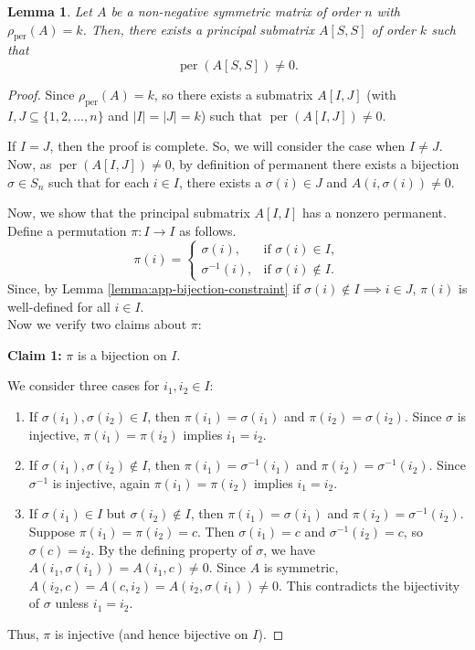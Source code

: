 \documentclass[11pt]{article}
\DeclareMathOperator{\per}{per}
\theoremstyle{plain}
\newtheorem{lemma}[theorem]{Lemma}
\theoremstyle{definition}
\theoremstyle{remark}
\begin{document}
\begin{lemma}\label{lemma:app-principal-existence}
Let \( A \) be a non-negative symmetric matrix of order \( n \) with \( \rho_{\per}(A) = k \). Then, there exists a principal submatrix \( A[S, S] \) of order \( k \) such that
\[
\per(A[S, S]) \neq 0.
\]
\end{lemma}

\begin{proof}

Since $\rho_{\per}(A)=k$, so there exists a submatrix \( A[I, J] \) (with \( I, J \subseteq \{1, 2, \dots, n\} \) and \( |I| = |J| = k \)) such that
\(
\per(A[I, J]) \neq 0.
\)

If $I=J$, then the proof is complete. So, we will consider the case when $I \neq J$. Now, as $\per(A[I, J]) \neq 0$, by definition of permanent there exists a bijection $\sigma \in S_n$ such that for each $i \in I$, there exists a $ \sigma(i) \in J$ and 
$ A(i,\sigma(i)) \neq 0. $

Now, we show that the principal submatrix \( A[I, I] \) has a nonzero permanent. Define a permutation \( \pi: I\to I \) as follows.
\[
\pi(i) = 
\begin{cases} 
\sigma(i), & \text{if } \sigma(i) \in I, \\[1mm]
\sigma^{-1}(i), & \text{if } \sigma(i) \notin I.
\end{cases}
\]
Since, by Lemma \ref{lemma:app-bijection-constraint} if \(\sigma(i) \notin I \implies i \in J \), \( \pi(i) \) is well-defined for all \( i \in I\). \\
Now we verify two claims about \( \pi \):


\textbf{Claim 1: }  \( \pi \) is a bijection on \( I \).


We consider three cases for \( i_1, i_2 \in I \):

\begin{enumerate}
    \item  If \( \sigma(i_1), \sigma(i_2) \in I \), then \( \pi(i_1) = \sigma(i_1) \) and \( \pi(i_2) = \sigma(i_2) \). Since \( \sigma \) is injective, \( \pi(i_1) = \pi(i_2) \) implies \( i_1 = i_2 \).
    
    \item  If \( \sigma(i_1), \sigma(i_2) \notin I \), then \( \pi(i_1) = \sigma^{-1}(i_1) \) and \( \pi(i_2) = \sigma^{-1}(i_2) \). Since \( \sigma^{-1} \) is injective, again \( \pi(i_1) = \pi(i_2) \) implies \( i_1 = i_2 \).
    
    \item If \( \sigma(i_1) \in I \) but \( \sigma(i_2) \notin I \), then \( \pi(i_1) = \sigma(i_1) \) and \( \pi(i_2) = \sigma^{-1}(i_2) \). Suppose \( \pi(i_1) = \pi(i_2) = c \). Then \( \sigma(i_1) = c \) and \( \sigma^{-1}(i_2) = c \), so \( \sigma(c) = i_2 \). By the defining property of \( \sigma \), we have \( A(i_1, \sigma(i_1)) = A(i_1, c) \neq 0 \). Since \( A \) is symmetric, \( A(i_2, c) = A(c, i_2) = A(i_2, \sigma(i_1)) \neq 0 \). This contradicts the bijectivity of \( \sigma \) unless \( i_1 = i_2 \).
\end{enumerate}
Thus, \( \pi \) is injective (and hence bijective on \( I \)).



\end{proof}
\end{document}
